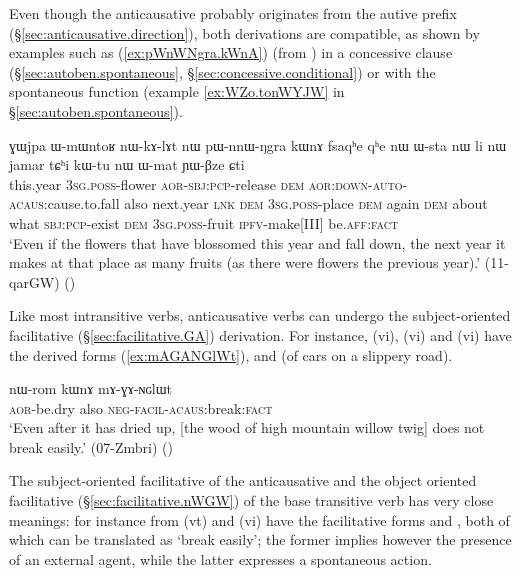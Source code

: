 Even though the anticausative probably originates from the autive prefix (§\ref{sec:anticausative.direction}), both derivations are compatible, as shown by examples such as  (\ref{ex:pWnWNgra.kWnA}) (from ) in a concessive clause (§\ref{sec:autoben.spontaneous}, §\ref{sec:concessive.conditional}) or with the spontaneous function (example \ref{ex:WZo.tonWYJW} in §\ref{sec:autoben.spontaneous}).

\begin{exe}
\ex \label{ex:pWnWNgra.kWnA}
\gll ɣɯjpa ɯ-mɯntoʁ nɯ-kɤ-lɤt nɯ pɯ-nnɯ-ŋgra kɯnɤ fsaqʰe qʰe nɯ ɯ-sta nɯ li nɯ jamar tɕʰi kɯ-tu nɯ ɯ-mat ɲɯ-βze ɕti  \\
this.year \textsc{3sg}.\textsc{poss}-flower \textsc{aor}-\textsc{sbj}:\textsc{pcp}-release \textsc{dem} \textsc{aor}:\textsc{down}-\textsc{auto}-\textsc{acaus}:cause.to.fall also next.year \textsc{lnk} \textsc{dem} \textsc{3sg}.\textsc{poss}-place \textsc{dem} again \textsc{dem} about what \textsc{sbj}:\textsc{pcp}-exist \textsc{dem} \textsc{3sg}.\textsc{poss}-fruit \textsc{ipfv}-make[III] be.\textsc{aff}:\textsc{fact} \\
\glt `Even if the flowers that have blossomed this year and fall down, the next year it makes at that place as many fruits (as there were flowers the previous year).' (11-qarGW)
()
\end{exe}

Like most intransitive verbs,  anticausative verbs can undergo the subject-orien\-ted facilitative (§\ref{sec:facilitative.GA})  derivation. For instance,  (vi),  (vi) and  (vi) have the derived forms   (\ref{ex:mAGANGlWt}),  and  (of cars on a slippery road). 

\begin{exe}
\ex \label{ex:mAGANGlWt}
\gll nɯ-rom kɯnɤ mɤ-ɣɤ-ɴɢlɯt  \\
\textsc{aor}-be.dry also \textsc{neg}-\textsc{facil}-\textsc{acaus}:break:\textsc{fact} \\
\glt `Even after it has dried up, [the wood of high mountain willow twig] does not break easily.' (07-Zmbri) ()
\end{exe}

The subject-oriented facilitative of the anticausative and the object oriented facilitative   (§\ref{sec:facilitative.nWGW}) of the base transitive verb has very close meanings: for instance from  (vt) and  (vi) have the facilitative forms  and , both of which can be translated as `break easily'; the former implies however the presence of an external agent, while the latter expresses a spontaneous action.

